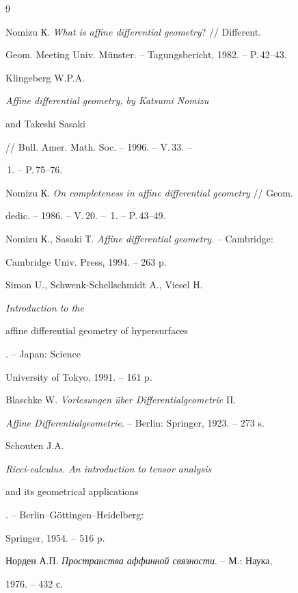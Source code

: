 \begin{thebibliography}{9} 


 




Nomizu К. {\em What is affine differential geometry}? // Different. 


Geom. Meeting Univ. M\"unster. -- Tagungsbericht, 1982. -- P.\,42--43. 




Klingeberg W.P.A. {\em Affine differential geometry, by Katsumi Nomizu 


and Takeshi Sasaki} // Bull. Amer. Math. Soc. -- 1996. -- V.\,33. -- 


\No\,1. -- P.\,75--76. 




Nomizu К. {\em On completeness in affine differential geometry} // Geom. 


dedic. -- 1986. -- V.\,20. -- \No\,1. -- P.\,43--49. 




Nomizu К., Sasaki Т. {\em Affine differential geometry}. -- Cambridge: 


Cambridge Univ. Press, 1994. -- 263 p. 




Simon U., Schwenk-Schellschmidt A., Viesel H. {\em Introduction to the 


affine differential geometry of hypersurfaces}. -- Japan: Science 


University of Tokyo, 1991. -- 161 p. 




Blaschke W. {\em Vorlesungen \"uber Differentialgeometrie} II. 


{\em Affine Differentialgeometrie}. -- Berlin: Springer, 1923. -- 273 s.




Schouten J.A. {\em Ricci-calculus. An introduction to tensor analysis 


and its geometrical applications}. -- Berlin--G\"ottingen--Heidelberg: 


Springer, 1954. -- 516 p. 




Норден А.П. {\em Пространства аффинной связности}. -- М.: Наука, 


1976. -- 432 с. 





\end{thebibliography}
